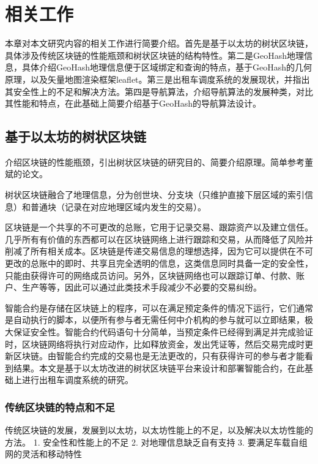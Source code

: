 \chapter{相关工作}
本章对本文研究内容的相关工作进行简要介绍。首先是基于以太坊的树状区块链，具体涉及传统区块链的性能瓶颈和树状区块链的结构特性。第二是GeoHash地理信息，具体介绍GeoHash地理信息便于区域绑定和查询的特点，基于GeoHash的几何原理，以及矢量地图渲染框架leaflet。第三是出租车调度系统的发展现状，并指出其安全性上的不足和解决方法。第四是导航算法，介绍导航算法的发展种类，对比其性能和特点，在此基础上简要介绍基于GeoHash的导航算法设计。\par

\section{基于以太坊的树状区块链}
介绍区块链的性能瓶颈，引出树状区块链的研究目的、简要介绍原理。简单参考董斌的论文。

树状区块链融合了地理信息，分为创世块、分支块（只维护直接下层区域的索引信息）和普通块（记录在对应地理区域内发生的交易）。

区块链是一个共享的不可更改的总账，它用于记录交易、跟踪资产以及建立信任。几乎所有有价值的东西都可以在区块链网络上进行跟踪和交易，从而降低了风险并削减了所有相关成本。区块链是传递交易信息的理想选择，因为它可以提供在不可更改的总账中的即时、共享且完全透明的信息，这类信息同时具备一定的安全性，只能由获得许可的网络成员访问。另外，区块链网络也可以跟踪订单、付款、账户、生产等等，因此可以通过此类技术手段减少不必要的交易纠纷。\par
智能合约是存储在区块链上的程序，可以在满足预定条件的情况下运行，它们通常是自动执行的脚本，以便所有参与者无需任何中介机构的参与就可以立即结果，极大保证安全性。智能合约代码语句十分简单，当预定条件已经得到满足并完成验证时，区块链网络将执行对应动作，比如释放资金，发出凭证等，然后交易完成时更新区块链。由智能合约完成的交易也是无法更改的，只有获得许可的参与者才能看到结果。本文是基于以太坊改进的树状区块链平台来设计和部署智能合约，在此基础上进行出租车调度系统的研究。\par

\subsection{传统区块链的特点和不足}
传统区块链的发展，发展到以太坊，以太坊性能上的不足，以及解决以太坊性能的方法。
1. 安全性和性能上的不足
2. 对地理信息缺乏自有支持
3. 要满足车载自组网的灵活和移动特性

